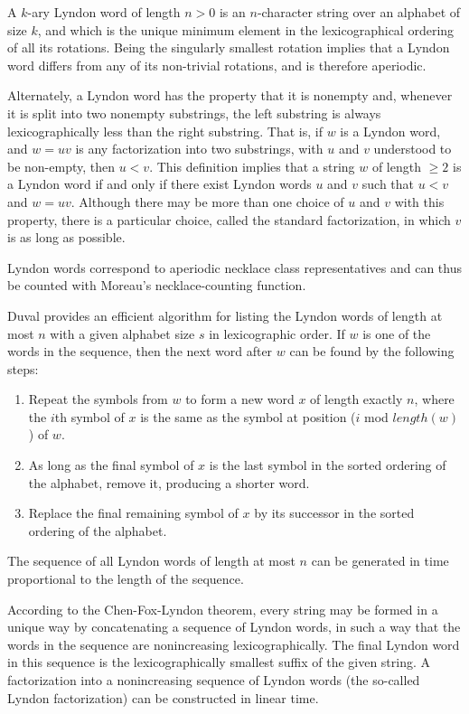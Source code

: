 A $k$-ary Lyndon word of length $n > 0$ is an $n$-character string over an alphabet of size $k$, and which is the unique minimum element in the lexicographical ordering of all its rotations. Being the singularly smallest rotation implies that a Lyndon word differs from any of its non-trivial rotations, and is therefore aperiodic.

Alternately, a Lyndon word has the property that it is nonempty and, whenever it is split into two nonempty substrings, the left substring is always lexicographically less than the right substring. That is, if $w$ is a Lyndon word, and $w = uv$ is any factorization into two substrings, with $u$ and $v$ understood to be non-empty, then $u < v$. This definition implies that a string $w$ of length $\ge 2$ is a Lyndon word if and only if there exist Lyndon words $u$ and $v$ such that $u < v$ and $w = uv$. Although there may be more than one choice of $u$ and $v$ with this property, there is a particular choice, called the standard factorization, in which $v$ is as long as possible.

Lyndon words correspond to aperiodic necklace class representatives and can thus be counted with Moreau's necklace-counting function.

Duval provides an efficient algorithm for listing the Lyndon words of length at most $n$ with a given alphabet size $s$ in lexicographic order. If $w$ is one of the words in the sequence, then the next word after $w$ can be found by the following steps:

\begin{enumerate}
\item Repeat the symbols from $w$ to form a new word $x$ of length exactly $n$, where the $i$th symbol of $x$ is the same as the symbol at position ($i$ mod $length(w)$) of $w$.
\item As long as the final symbol of $x$ is the last symbol in the sorted ordering of the alphabet, remove it, producing a shorter word.
\item Replace the final remaining symbol of $x$ by its successor in the sorted ordering of the alphabet.
\end{enumerate}

The sequence of all Lyndon words of length at most $n$ can be generated in time proportional to the length of the sequence.

According to the Chen-Fox-Lyndon theorem, every string may be formed in a unique way by concatenating a sequence of Lyndon words, in such a way that the words in the sequence are nonincreasing lexicographically. The final Lyndon word in this sequence is the lexicographically smallest suffix of the given string. A factorization into a nonincreasing sequence of Lyndon words (the so-called Lyndon factorization) can be constructed in linear time.

